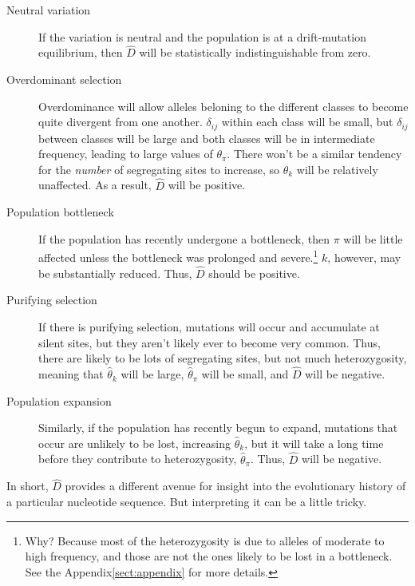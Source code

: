 \begin{description}

\item[Neutral variation] If the variation is neutral and the
  population is at a drift-mutation equilibrium, then $\hat D$ will be
  statistically indistinguishable from zero.

\item[Overdominant selection] Overdominance will allow alleles
  beloning to the different classes to become quite divergent from one
  another. $\delta_{ij}$ within each class will be small, but
  $\delta_{ij}$ between classes will be large and both classes will be
  in intermediate frequency, leading to large values of
  $\theta_\pi$. There won't be a similar tendency for the {\it
  number\/} of segregating sites to increase, so $\theta_k$ will be
  relatively unaffected. As a result, $\hat D$ will be positive.

\item[Population bottleneck] If the population has recently undergone
  a bottleneck, then $\pi$ will be little affected unless the
  bottleneck was prolonged and severe.\footnote{Why? Because most of
    the heterozygosity is due to alleles of moderate to high
    frequency, and those are not the ones likely to be lost in a
    bottleneck. See the Appendix\ref{sect:appendix} for more details.}
  $k$, however, may be substantially reduced. Thus, $\hat D$ should be
  positive.

\item[Purifying selection] If there is purifying selection, mutations
  will occur and accumulate at silent sites, but they aren't likely
  ever to become very common. Thus, there are likely to be lots of
  segregating sites, but not much heterozygosity, meaning that
  $\hat\theta_k$ will be large, $\hat\theta_\pi$ will be small, and
  $\hat D$ will be negative.

\item[Population expansion] Similarly, if the population has recently
  begun to expand, mutations that occur are unlikely to be lost,
  increasing $\hat\theta_k$, but it will take a long time before they
  contribute to heterozygosity, $\hat\theta_\pi$. Thus, $\hat D$ will
  be negative.

\end{description}

In short, $\hat D$ provides a different avenue for insight into the
evolutionary history of a particular nucleotide sequence. But
interpreting it can be a little tricky. 


